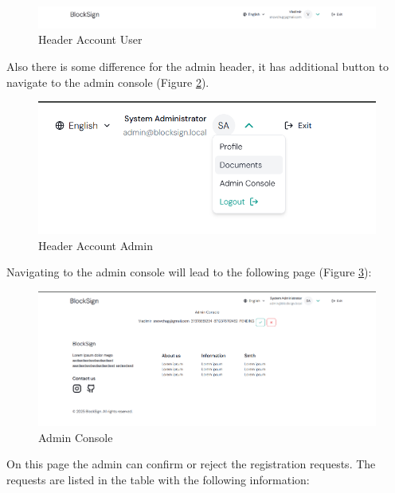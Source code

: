 \begin{figure}[H]
    \centering
    \includegraphics[width=18cm]{"images/siteUI/headerAccountUser.png"}
    \caption{Header Account User}
    \label{header-account-user}
\end{figure}

Also there is some difference for the admin header, it has additional button to navigate to the admin console (Figure \ref{header-account-admin}).

\begin{figure}[H]
    \centering
    \includegraphics[width=18cm]{"images/siteUI/headerAccountAdmin.png"}
    \caption{Header Account Admin}
    \label{header-account-admin}
\end{figure}

Navigating to the admin console will lead to the following page (Figure \ref{admin-console}):

\begin{figure}[H]
    \centering
    \includegraphics[width=18cm]{"images/siteUI/adminConsole.png"}
    \caption{Admin Console}
    \label{admin-console}
\end{figure}

On this page the admin can confirm or reject the registration requests. The requests are listed in the table with the following information:

